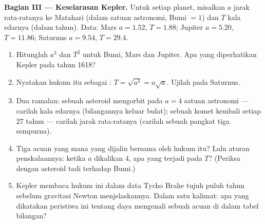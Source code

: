 \begin{problem}
\medskip
\noindent\textbf{Bagian III --- Keselarasan Kepler.}
Untuk setiap planet, misalkan $a$ jarak rata-ratanya ke Matahari (dalam
satuan astronomi, Bumi $= 1$) dan $T$ kala edarnya (dalam tahun).
Data: Mars $a = 1.52$, $T = 1.88$; Jupiter $a = 5.20$,
$T = 11.86$; Saturnus $a = 9.54$, $T = 29.4$.
\begin{enumerate}[resume]
  \item Hitunglah $a^3$ dan $T^2$ untuk Bumi, Mars dan Jupiter.
        Apa yang diperhatikan Kepler pada tahun 1618?
  \item Nyatakan hukum itu sebagai : $T = \sqrt{a^3} = a\sqrt a$.
        Ujilah pada Saturnus.
  \item Dua ramalan: sebuah asteroid mengorbit pada $a = 4$ satuan astronomi ---
        carilah kala edarnya (bilangannya keluar bulat); sebuah komet
        kembali setiap $27$ tahun --- carilah jarak rata-ratanya
        (carilah sebuah pangkat tiga sempurna).
  \item Tiga  acuan yang mana yang dijalin bersama oleh hukum itu?
        Lalu aturan penskalaannya: ketika $a$ dikalikan
        $4$, apa yang terjadi pada $T$? (Periksa dengan asteroid tadi
        terhadap Bumi.)
  \item Kepler membaca hukum ini dalam data Tycho Brahe tujuh puluh tahun
        sebelum gravitasi Newton menjelaskannya. Dalam satu
        kalimat: apa yang dikatakan peristiwa ini tentang daya
        mengenali sebuah  acuan di dalam tabel bilangan?
\end{enumerate}


\end{problem}
